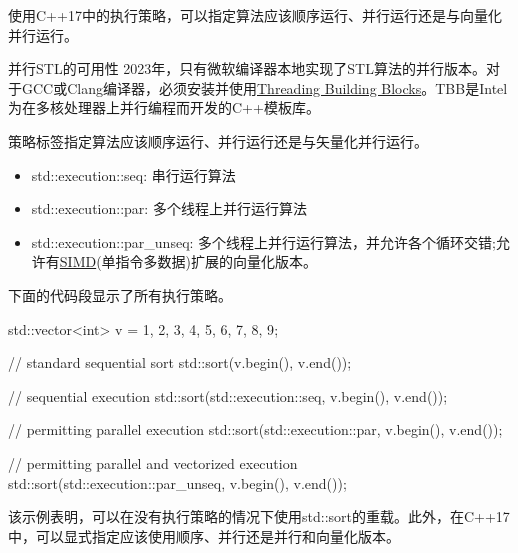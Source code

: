 使用C++17中的执行策略，可以指定算法应该顺序运行、并行运行还是与向量化并行运行。

\begin{myTip}{并行STL的可用性}
2023年，只有微软编译器本地实现了STL算法的并行版本。对于GCC或Clang编译器，必须安装并使用\href{https://en.wikipedia.org/wiki/Threading_Building_Blocks}{Threading Building Blocks}。TBB是Intel为在多核处理器上并行编程而开发的C++模板库。
\end{myTip}


策略标签指定算法应该顺序运行、并行运行还是与矢量化并行运行。

\begin{itemize}
\item
std::execution::seq: 串行运行算法

\item
std::execution::par: 多个线程上并行运行算法

\item
std::execution::par\_unseq: 多个线程上并行运行算法，并允许各个循环交错;允许有\href{https://en.wikipedia.org/wiki/SIMD}{SIMD}(单指令多数据)扩展的向量化版本。
\end{itemize}

下面的代码段显示了所有执行策略。


\begin{cpp}
std::vector<int> v = {1, 2, 3, 4, 5, 6, 7, 8, 9};

// standard sequential sort
std::sort(v.begin(), v.end());

// sequential execution
std::sort(std::execution::seq, v.begin(), v.end());

// permitting parallel execution
std::sort(std::execution::par, v.begin(), v.end());

// permitting parallel and vectorized execution
std::sort(std::execution::par_unseq, v.begin(), v.end());
\end{cpp}

该示例表明，可以在没有执行策略的情况下使用std::sort的重载。此外，在C++17中，可以显式指定应该使用顺序、并行还是并行和向量化版本。


